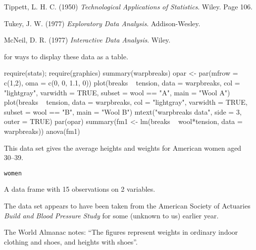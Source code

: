 %
\begin{Source}\relax
Tippett, L. H. C. (1950)
\emph{Technological Applications of Statistics}.
Wiley.  Page 106.

\end{Source}
%
\begin{References}\relax
Tukey, J. W. (1977)
\emph{Exploratory Data Analysis}.
Addison-Wesley.

McNeil, D. R. (1977)
\emph{Interactive Data Analysis}.
Wiley.
\end{References}
%
\begin{SeeAlso}\relax
{} for ways to display these data as a table.
\end{SeeAlso}
%
\begin{Examples}
\begin{ExampleCode}
require(stats); require(graphics)
summary(warpbreaks)
opar <- par(mfrow = c(1,2), oma = c(0, 0, 1.1, 0))
plot(breaks ~ tension, data = warpbreaks, col = "lightgray",
     varwidth = TRUE, subset = wool == "A", main = "Wool A")
plot(breaks ~ tension, data = warpbreaks, col = "lightgray",
     varwidth = TRUE, subset = wool == "B", main = "Wool B")
mtext("warpbreaks data", side = 3, outer = TRUE)
par(opar)
summary(fm1 <- lm(breaks ~ wool*tension, data = warpbreaks))
anova(fm1)
\end{ExampleCode}
\end{Examples}
%
\begin{Description}\relax
This data set gives the average heights and weights for American women
aged 30--39.
\end{Description}
%
\begin{Usage}
\begin{verbatim}
women
\end{verbatim}
\end{Usage}
%
\begin{Format}
A data frame with 15 observations on 2 variables.

\end{Format}
%
\begin{Details}\relax
The data set appears to have been taken from the American Society of
Actuaries \emph{Build and Blood Pressure Study} for some (unknown to
us) earlier year.

The World Almanac notes: ``The figures represent weights in
ordinary indoor clothing and shoes, and heights with shoes''.
\end{Details}
